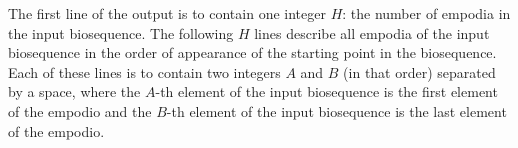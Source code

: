 The first line of the output is to contain one integer $H$: the number of empodia in the input biosequence. The following $H$ lines describe all empodia of the input biosequence in the order of appearance of the starting point in the biosequence. Each of these lines is to contain two integers $A$ and $B$ (in that order) separated by a space, where the $A$-th element of the input biosequence is the first element of the empodio and the $B$-th element of the input biosequence is the last element of the empodio. 